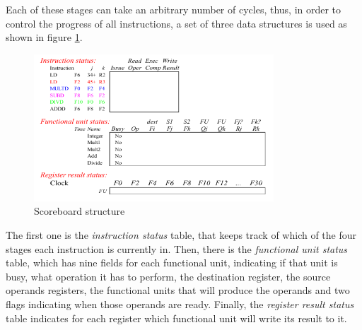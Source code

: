 Each of these stages can take an arbitrary number of cycles, thus, in order to control the progress of all instructions, a set of three data structures is used as shown in figure \ref{fig:scoreboard}.
\begin{figure}[hbtp]
  \centering
  \includegraphics[width=0.8\textwidth]{img/scoreboard.pdf}
  \caption{Scoreboard structure}
  \label{fig:scoreboard}
\end{figure}
The first one is the \emph{instruction status} table, that keeps track of which of the four stages each instruction is currently in. Then, there is the \emph{functional unit status} table, which has nine fields for each functional unit, indicating if that unit is busy, what operation it has to perform, the destination register, the source operands registers, the functional units that will produce the operands and two flags indicating when those operands are ready. Finally, the \emph{register result status} table indicates for each register which functional unit will write its result to it.

